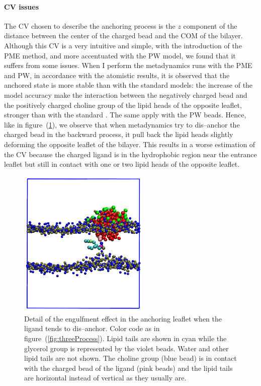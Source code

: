\paragraph{\textbf{CV issues}} The \ac{CV} chosen to describe the anchoring process is the $z$ component of the distance between the center of the charged bead and the \ac{COM} of the bilayer. Although this \ac{CV} is a very intuitive and simple, with the introduction of the \ac{PME} method, and more accentuated with the \ac{PW} model, we found that it suffers from some issues. When I perform the metadynamics runs with the \ac{PME} and \ac{PW}, in accordance with the atomistic results, it is observed that the anchored state is more stable than with the standard \martini models: the increase of the model accuracy make the interaction between the negatively charged bead and the positively charged choline group of the lipid heads of the opposite leaflet, stronger than with the standard \martini. The same apply with the \ac{PW} beads. Hence, like in figure~(\ref{fig:engulfment}), we observe that when metadynamics try to dis--anchor the charged bead in the backward process, it pull back the lipid heads slightly deforming the opposite leaflet of the bilayer. This results in a worse estimation of the \ac{CV} because the charged ligand is in the hydrophobic region near the entrance leaflet but still in contact with one or two lipid heads of the opposite leaflet.
\begin{figure}
	\centering
	\includegraphics[width=0.55\textwidth]{./img/patchedEngulfment}
	\caption{Detail of the engulfment effect in the anchoring leaflet when the ligand tends to dis--anchor. Color code as in figure~(\ref{fig:threeProcess}). Lipid tails are shown in cyan while the glycerol group is represented by the violet beads. Water and other lipid tails are not shown. The choline group (blue bead) is in contact with the charged bead of the ligand (pink beads) and the lipid tails are horizontal instead of vertical as they usually are.}
	\label{fig:engulfment}
\end{figure}
